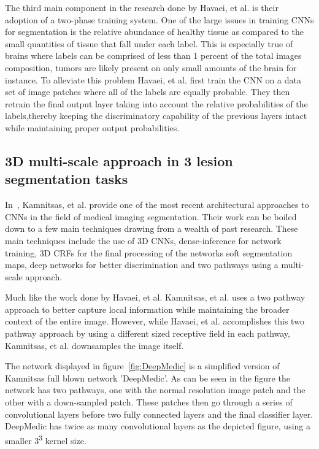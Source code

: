 \documentclass{sig-alternate}
\begin{document}
The third main component in the research done by Havaei, et al. is their adoption of a two-phase training system. One of the large issues in training CNNs for segmentation is the relative abundance of healthy tissue as compared to the small quantities of tissue that fall under each label. This is especially true of brains where labels can be comprised of less than 1 percent of the total images composition, tumors are likely present on only small amounts of the brain for instance. To alleviate this problem Havaei, et al. first train the CNN on a data set of image patches where all of the labels are equally probable. They then retrain the final output layer taking into account the relative probabilities of the labels,thereby keeping the discriminatory capability of the previous layers intact while maintaining proper output probabilities.



\subsection{3D multi-scale approach in 3 lesion segmentation tasks}
\label{sec:3DMultiScale}

In~\cite{Kamnitsas:2017}, Kamnitsas, et al. provide one of the most recent architectural approaches to CNNs in the field of medical imaging segmentation. Their work can be boiled down to a few main techniques drawing from a wealth of past research. These main techniques include the use of 3D CNNs, dense-inference for network training, 3D CRFs for the final processing of the networks soft segmentation maps, deep networks for better discrimination and two pathways using a multi-scale approach.

Much like the work done by Havaei, et al. Kamnitsas, et al. uses a two pathway approach to better capture local information while maintaining the broader context of the entire image. However, while Havaei, et al. accomplishes this two pathway approach by using a different sized receptive field in each pathway, Kamnitsas, et al. downsamples the image itself.


\begin{figure*}
\centering
{}
\caption{The basic neural network architecture used by Kamnitsas, et al. in~\cite{Kamnitsas:2017}}
\label{fig:DeepMedic}
\end{figure*}

The network displayed in figure~\ref{fig:DeepMedic} is a simplified version of Kamnitsas full blown network 'DeepMedic'. As can be seen in the figure the network has two pathways, one with the normal resolution image patch and the other with a down-sampled patch. These patches then go through a series of convolutional layers before two fully connected layers and the final classifier layer. DeepMedic has twice as many convolutional layers as the depicted figure, using a smaller 3\textsuperscript{3} kernel size.
\end{document}
